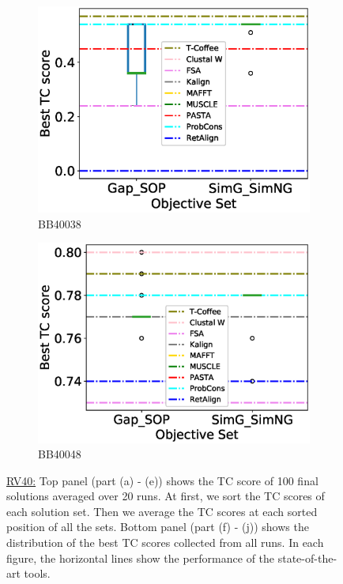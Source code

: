 \begin{figure}[!htbp]
\begin{adjustwidth}{-1.5cm}{-1cm}
\begin{subfigure}{0.22\textwidth}
			\includegraphics[width=\columnwidth]{Figure/summary/precomputedInit/Balibase/BB40038_objset_tc_rank_2}
			\caption{BB40038}
		\end{subfigure}
		\begin{subfigure}{0.22\textwidth}
			\includegraphics[width=\columnwidth]{Figure/summary/precomputedInit/Balibase/BB40048_objset_tc_rank_2}
			\caption{BB40048}
		\end{subfigure}
		\end{adjustwidth}
		\caption[TC score results on RV40]{\underline{RV40:} Top panel (part (a) - (e)) shows the TC score of 100 final solutions averaged over 20 runs. At first, we sort the TC scores of each solution set. Then we average the TC scores at each sorted position of all the sets. Bottom panel (part (f) - (j)) shows the distribution of the best TC scores collected from all runs. In each figure, the horizontal lines show the performance of the state-of-the-art tools.}
		\label{fig:rv40_tc}

\end{figure}



